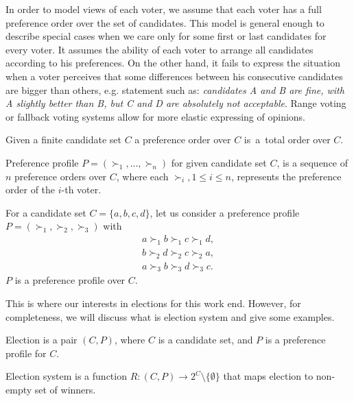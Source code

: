 In order to model views of each voter,
we assume that each voter has a full preference order over the set of candidates.
This model is general enough to describe special cases
when we care only for some first or last candidates for every voter.
It assumes the ability of each voter to arrange all candidates according to his preferences.
On the other hand, it fails to express the situation when a voter perceives that some differences
between his consecutive candidates are bigger than others, e.g. statement such as:
\textit{candidates A and B are fine, with A slightly better than B, but C and D are absolutely not acceptable}.
Range voting \cite{rangevoting} or fallback voting \cite{fallbackvoting} systems
allow for more elastic expressing of opinions.

\begin{defn}
Given a finite candidate set $C$ a preference order over $C$
is~a~total order over $C$.
\end{defn}

\begin{defn}
Preference profile $P = (\succ_1, ... , \succ_n)$ for given candidate set $C$,
is a sequence of $n$ preference orders over $C$,
where each $\succ_i, 1 \leq i \leq n$, represents the preference order of the $i$-th voter.
\end{defn}

\begin{exmp}
For a candidate set $C = \{a, b, c, d\}$,
let us consider a preference profile $P = (\succ_1, \succ_2, \succ_3)$ with
\begin{align*}
a \succ_1 b \succ_1 c \succ_1 d, \\
b \succ_2 d \succ_2 c \succ_2 a,	\\
a \succ_3 b \succ_3 d \succ_3 c.
\end{align*}
$P$ is a preference profile over $C$.
\end{exmp}

This is where our interests in elections for this work end.
However, for completeness, we will discuss what is election system and give some examples.

\begin{defn}[election]
Election is a pair $(C, P)$, where $C$ is a candidate set, and $P$ is a preference profile for $C$.
\end{defn}

\begin{defn}
Election system is a function $R : (C,P) \rightarrow 2^{C} \setminus \{\emptyset\}$
that maps election to non-empty set of winners.
\end{defn}

